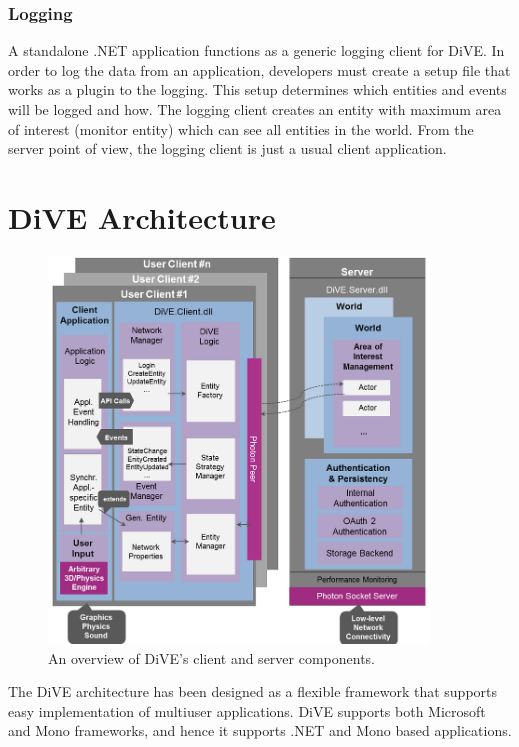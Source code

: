 \documentclass[]{elsarticle}
\begin{document}
\subsubsection{Logging}
A standalone .NET application functions as a generic logging client for DiVE. In order to log the data from an application, developers must create a setup file that works as a plugin to the logging. This setup determines which entities and events will be logged and how. The logging client creates an entity with maximum area of interest (monitor entity) which can see all entities in the world. From the server point of view, the logging client is just a usual client application.




\section{DiVE Architecture}

\begin{figure}[t]
\centering
\includegraphics[width=0.9\textwidth]{acm-vrst13-img/DiVE-simple.png}
\caption{An overview of DiVE's client and server components.}
\label{fig:dive_general}
\end{figure}

The DiVE architecture has been designed as a flexible framework that supports easy implementation of multiuser applications.
DiVE supports both Microsoft and Mono frameworks, and hence it supports .NET and Mono based applications.
\end{document}
